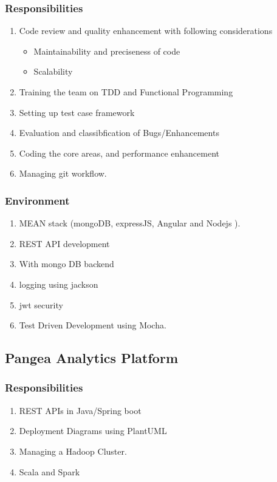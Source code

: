 \documentclass[letterpaper]{article}
\begin{document}
\subsubsection{Responsibilities}
\label{sec:orgheadline6}
\begin{enumerate}
\item Code review and quality enhancement with following considerations
\begin{itemize}
\item Maintainability and preciseness of code
\item Scalability
\end{itemize}
\item Training the team on TDD and Functional Programming
\item Setting up test case framework
\item Evaluation and classibfication of Bugs/Enhancements
\item Coding the core areas, and performance enhancement
\item Managing git workflow.
\end{enumerate}

\subsubsection{Environment}
\label{sec:orgheadline7}
\begin{enumerate}
\item MEAN stack (mongoDB, expressJS, Angular and Nodejs ).
\item REST API development
\item With mongo DB backend
\item logging using jackson
\item jwt security
\item Test Driven Development using Mocha.
\end{enumerate}


\subsection{Pangea Analytics Platform}
\label{sec:orgheadline10}

\subsubsection{Responsibilities}
\label{sec:orgheadline9}
\begin{enumerate}
\item REST APIs in Java/Spring boot
\item Deployment Diagrams using PlantUML
\item Managing a Hadoop Cluster.
\item Scala and Spark
\end{enumerate}
\end{document}
